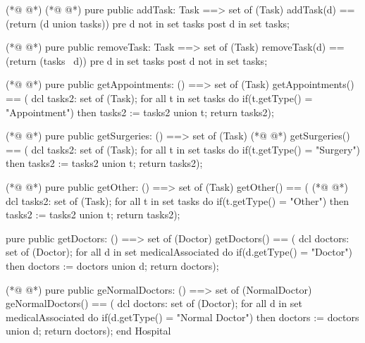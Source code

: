 \begin{vdmpp}[breaklines=true]
(*@
\label{removeTechnician:52}
@*)
(*@
\label{addTask:52}
@*)
 pure public addTask: Task ==> set of (Task)
  addTask(d) == (return ({d} union tasks))
 pre d not in set tasks
 post d in set tasks;
  
(*@
\label{removeTask:57}
@*)
 pure public removeTask: Task ==> set of (Task)
  removeTask(d) == (return (tasks \ {d}))
 pre d in set tasks
 post d not in set tasks;
 
(*@
\label{getAppointments:62}
@*)
 pure public getAppointments: () ==> set of (Task)
  getAppointments() == (
              dcl tasks2: set of (Task);
              for all t in set tasks do
               if(t.getType() = "Appointment")
                then tasks2 := tasks2 union {t};
              return tasks2);
              
(*@
\label{getSurgeries:70}
@*)
 pure public getSurgeries: () ==> set of (Task)
(*@
\label{numDoctors:71}
@*)
  getSurgeries() == (
              dcl tasks2: set of (Task);
              for all t in set tasks do
               if(t.getType() = "Surgery")
                then tasks2 := tasks2 union {t};
              return tasks2);
              
(*@
\label{getOther:78}
@*)
 pure public getOther: () ==> set of (Task)
  getOther() == (
(*@
\label{getDoctors:80}
@*)
              dcl tasks2: set of (Task);
              for all t in set tasks do
               if(t.getType() = "Other")
                then tasks2 := tasks2 union {t};
              return tasks2);

 pure public getDoctors: () ==> set of (Doctor)
  getDoctors() == (
           dcl doctors: set of (Doctor);
           for all d in set medicalAssociated do
            if(d.getType() = "Doctor")
             then doctors := doctors union {d};
           return doctors);
           
(*@
\label{geNormalDoctors:94}
@*)
  pure public geNormalDoctors: () ==> set of (NormalDoctor)
  geNormalDoctors() == (
           dcl doctors: set of (Doctor);
           for all d in set medicalAssociated do
            if(d.getType() = "Normal Doctor")
             then doctors := doctors union {d};
           return doctors);
end Hospital
\end{vdmpp}
